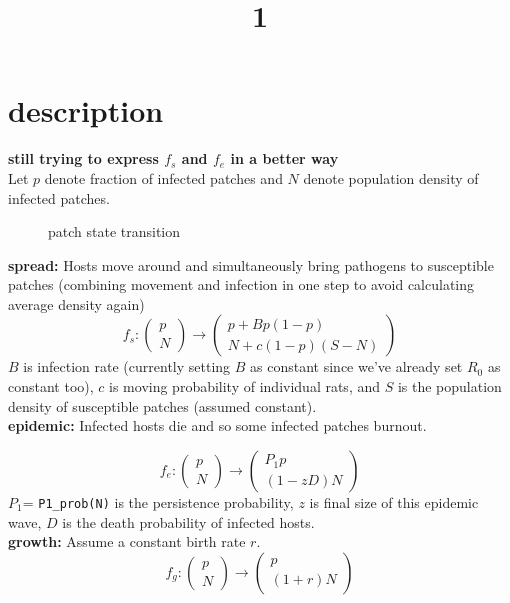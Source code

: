 \documentclass[12pt]{article}
\title{1}
\begin{document}
\section{description}
\textbf{still trying to express $f_s$ and $f_e$ in a better way}\\
Let $p$ denote fraction of infected patches and $N$ denote population density of infected patches. 
\begin{figure}[H]
\centering
{}
\caption{patch state transition}
\end{figure}
\textbf{spread:}
Hosts move around and simultaneously bring pathogens to susceptible patches (combining movement and infection in one step to avoid calculating average density again)
$$f_s:\begin{pmatrix}
    p\\N
\end{pmatrix}
\to \begin{pmatrix}
    p+Bp(1-p)\\
    N+c(1-p)(S-N)
\end{pmatrix}$$
$B$ is infection rate (currently setting $B$ as constant
since we've already set $R_0$ as constant too), $c$ is moving probability of individual rats, and $S$ is the population density of susceptible patches (assumed constant).\\

\textbf{epidemic:}
Infected hosts die and so some infected patches burnout. 

$$f_e:\begin{pmatrix}
    p\\N
\end{pmatrix}
\to \begin{pmatrix}
    P_1p\\
    (1-zD)N
\end{pmatrix}$$
$P_1$=
\lstinline{P1_prob(N)} is the persistence probability, $z$ is final size of this epidemic wave, $D$ is the death probability of infected hosts. \\

\textbf{growth:}
Assume a constant birth rate $r$.
$$f_g:\begin{pmatrix}
    p\\N
\end{pmatrix}
\to \begin{pmatrix}
    p\\
    (1+r)N
\end{pmatrix}$$
\\
\end{document}
